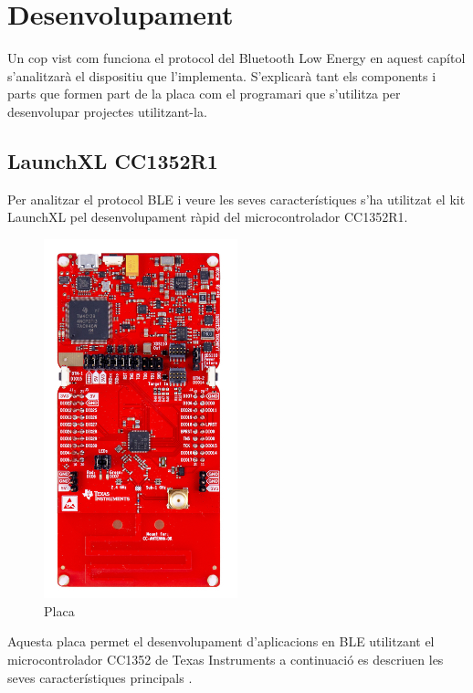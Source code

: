 \chapter{Desenvolupament}
Un cop vist com funciona el protocol del Bluetooth Low Energy en aquest capítol s'analitzarà el dispositiu que l'implementa.
S'explicarà tant els components i parts que formen part de la placa com el programari que s'utilitza per desenvolupar projectes utilitzant-la.

\section{LaunchXL CC1352R1}
Per analitzar el protocol BLE i veure les seves característiques s'ha utilitzat el kit LaunchXL pel desenvolupament ràpid del microcontrolador CC1352R1.
\begin{figure}[h!]
	\begin{center}
		\includegraphics[width=0.5\textwidth]{./images/launchxl-cc1352r1.jpg}
		\caption{Placa \cite{placa}}
	\end{center}
\end{figure}

Aquesta placa permet el desenvolupament d'aplicacions en BLE utilitzant el microcontrolador CC1352 de Texas Instruments a continuació es descriuen les seves característiques principals \cite{placa_datasheet}.

